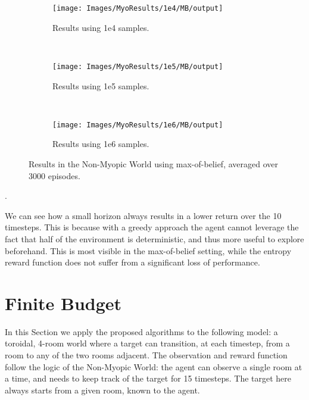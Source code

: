 \begin{figure}[ht!]
        \centering
        \begin{subfigure}[t]{0.3\textwidth}
                \texttt{[image: Images/MyoResults/1e4/MB/output]}
                \caption{Results using 1e4 samples.}
                \label{fig:m4m}
        \end{subfigure}%
        ~ %
        \begin{subfigure}[t]{0.3\textwidth}
                \texttt{[image: Images/MyoResults/1e5/MB/output]}
                \caption{Results using 1e5 samples.}
                \label{fig:m5m}
        \end{subfigure}
        ~ %
        \begin{subfigure}[t]{0.3\textwidth}
                \texttt{[image: Images/MyoResults/1e6/MB/output]}
                \caption{Results using 1e6 samples.}
                \label{fig:m6m}
        \end{subfigure}
        \caption{Results in the Non-Myopic World using max-of-belief, averaged over 3000 episodes.}
        \label{ref:myombfig}
\end{figure}

.

We can see how a small horizon always results in a lower return over the 10 timesteps. This is
because with a greedy approach the agent cannot leverage the fact that half of the environment is
deterministic, and thus more useful to explore beforehand. This is most visible in the max-of-belief
setting, while the entropy reward function does not suffer from a significant loss of performance.

\clearpage
\section{Finite Budget}

In this Section we apply the proposed algorithms to the following model: a toroidal, 4-room world
where a target can transition, at each timestep, from a room to any of the two rooms adjacent. The
observation and reward function follow the logic of the Non-Myopic World: the agent can observe a
single room at a time, and needs to keep track of the target for 15 timesteps. The target here
always starts from a given room, known to the agent.

